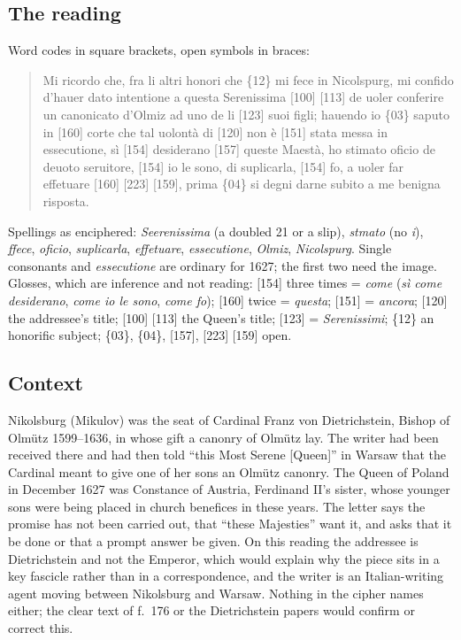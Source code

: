 \documentclass[11pt]{article}
\begin{document}
\subsection{The reading}

Word codes in square brackets, open symbols in braces:

\begin{quote}\small
Mi ricordo che, fra li altri honori che \{12\} mi fece in Nicolspurg, mi confido d'hauer dato intentione a questa Serenissima [100] [113] de uoler conferire un canonicato d'Olmiz ad uno de li [123] suoi figli; hauendo io \{03\} saputo in [160] corte che tal uolont\`a di [120] non \`e [151] stata messa in essecutione, s\`i [154] desiderano [157] queste Maest\`a, ho stimato oficio de deuoto seruitore, [154] io le sono, di suplicarla, [154] fo, a uoler far effetuare [160] [223] [159], prima \{04\} si degni darne subito a me benigna risposta.
\end{quote}

Spellings as enciphered: \emph{Seerenissima} (a doubled 21 or a slip), \emph{stmato} (no \emph{i}), \emph{ffece}, \emph{oficio}, \emph{suplicarla}, \emph{effetuare}, \emph{essecutione}, \emph{Olmiz}, \emph{Nicolspurg}. Single consonants and \emph{essecutione} are ordinary for 1627; the first two need the image. Glosses, which are inference and not reading: [154] three times = \emph{come} (\emph{s\`i come desiderano}, \emph{come io le sono}, \emph{come fo}); [160] twice = \emph{questa}; [151] = \emph{ancora}; [120] the addressee's title; [100] [113] the Queen's title; [123] = \emph{Serenissimi}; \{12\} an honorific subject; \{03\}, \{04\}, [157], [223] [159] open.

\subsection{Context}

Nikolsburg (Mikulov) was the seat of Cardinal Franz von Dietrichstein, Bishop of Olm\"utz 1599--1636, in whose gift a canonry of Olm\"utz lay. The writer had been received there and had then told ``this Most Serene [Queen]'' in Warsaw that the Cardinal meant to give one of her sons an Olm\"utz canonry. The Queen of Poland in December 1627 was Constance of Austria, Ferdinand II's sister, whose younger sons were being placed in church benefices in these years. The letter says the promise has not been carried out, that ``these Majesties'' want it, and asks that it be done or that a prompt answer be given. On this reading the addressee is Dietrichstein and not the Emperor, which would explain why the piece sits in a key fascicle rather than in a correspondence, and the writer is an Italian-writing agent moving between Nikolsburg and Warsaw. Nothing in the cipher names either; the clear text of f.~176 or the Dietrichstein papers would confirm or correct this.
\end{document}
